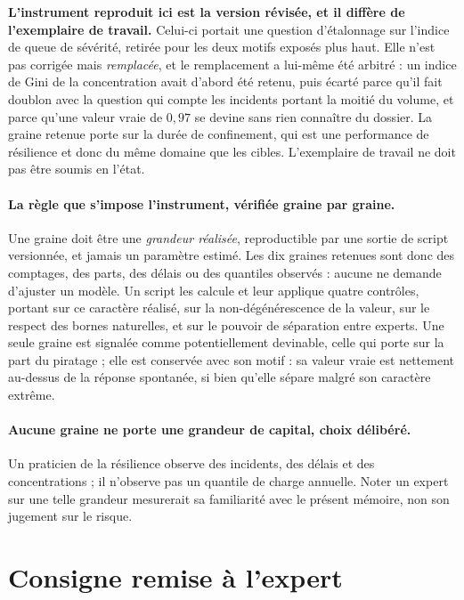 \begin{attention}
\textbf{L'instrument reproduit ici est la version révisée, et il diffère de l'exemplaire de
travail.} Celui-ci portait une question d'étalonnage sur l'indice de queue de sévérité, retirée
pour les deux motifs exposés plus haut. Elle n'est pas corrigée mais \emph{remplacée}, et le
remplacement a lui-même été arbitré : un indice de Gini de la concentration avait d'abord été
retenu, puis écarté parce qu'il fait doublon avec la question qui compte les incidents portant la
moitié du volume, et parce qu'une valeur vraie de $0{,}97$ se devine sans rien connaître du
dossier. La graine retenue porte sur la durée de confinement, qui est une performance de
résilience et donc du même domaine que les cibles. L'exemplaire de travail ne doit pas
être soumis en l'état.
\end{attention}

\paragraph{La règle que s'impose l'instrument, vérifiée graine par graine.} Une graine doit être une
\emph{grandeur réalisée}, reproductible par une sortie de script versionnée, et jamais un
paramètre estimé. Les dix graines retenues sont donc des comptages, des parts, des délais ou des
quantiles observés : aucune ne demande d'ajuster un modèle. Un script les calcule et leur applique
quatre contrôles, portant sur ce caractère réalisé, sur la non-dégénérescence de la valeur, sur le
respect des bornes naturelles, et sur le pouvoir de séparation entre experts. Une seule graine est
signalée comme potentiellement devinable, celle qui porte sur la part du piratage ; elle est
conservée avec son motif : sa valeur vraie est nettement au-dessus de la réponse spontanée, si
bien qu'elle sépare malgré son caractère extrême.

\paragraph{Aucune graine ne porte une grandeur de capital, choix délibéré.} Un praticien de la
résilience observe des incidents, des délais et des concentrations ; il n'observe pas un quantile
de charge annuelle. Noter un expert sur une telle grandeur mesurerait sa familiarité avec le
présent mémoire, non son jugement sur le risque.

\section*{Consigne remise à l'expert}

